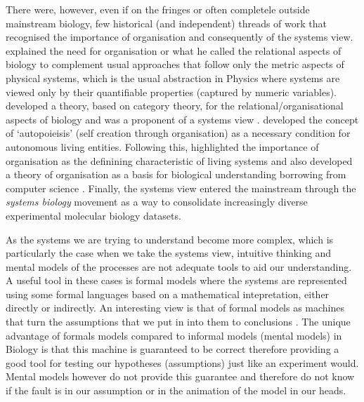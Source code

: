 \documentclass[phd]{infthesis}
\begin{document}
There were, however, even if on the fringes or often completele outside
mainstream biology, few historical (and independent) threads of work that
recognised the importance of organisation and consequently of the systems
view. \citet{rashevsky_topology_1954} explained the need for organisation or
what he called the relational aspects of biology to complement usual approaches
that follow only the metric aspects of physical systems, which is the usual
abstraction in Physics where systems are viewed only by their quantifiable
properties (captured by numeric variables). \citet{rosen_relational_1958}
developed a theory, based on category theory, for the relational/organisational
aspects of biology and was a proponent of a systems view
\citep{rosen1991life}. \citet{varela_autopoiesis:_1974} developed the concept of
`autopoieisis' (self creation through organisation) as a necessary condition for
autonomous living entities. Following this, \citet{fontana_what_1994}
highlighted the importance of organisation as the definining characteristic of
living systems and also developed a theory of organisation as a basis for
biological understanding borrowing from computer science
\citep[$\lambda$-calculus in particular;][]{fontana_barrier_1996}. Finally, the
systems view entered the mainstream through the \emph{systems biology} movement
\citep{kitano2002systems} as a way to consolidate increasingly diverse
experimental molecular biology datasets.

As the systems we are trying to understand become more complex, which is
particularly the case when we take the systems view, intuitive thinking and
mental models of the processes are not adequate tools to aid our
understanding. A useful tool in these cases is formal models where the systems
are represented using some formal languages based on a mathematical
intepretation, either directly or indirectly. An interesting view is that of
formal models as machines that turn the assumptions that we put in into them to
conclusions \citet{gunawardena_models_2014}. The unique advantage of formals
models compared to informal models (mental models) in Biology is that this
machine is guaranteed to be correct therefore providing a good tool for testing
our hypotheses (assumptions) just like an experiment would. Mental models
however do not provide this guarantee and therefore do not know if the fault is
in our assumption or in the animation of the model in our heads.
\end{document}
